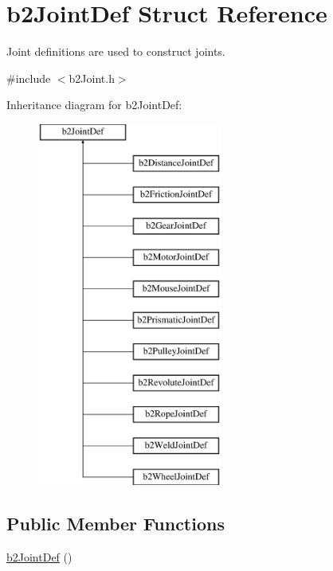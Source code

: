 \hypertarget{structb2_joint_def}{}\section{b2\+Joint\+Def Struct Reference}
\label{structb2_joint_def}


Joint definitions are used to construct joints.  




{\ttfamily \#include $<$b2\+Joint.\+h$>$}

Inheritance diagram for b2\+Joint\+Def\+:\begin{figure}[H]
\begin{center}
\leavevmode
\includegraphics[height=12.000000cm]{structb2_joint_def}
\end{center}
\end{figure}
\subsection*{Public Member Functions}
\begin{DoxyCompactItemize}
\item 
\mbox{\hyperlink{structb2_joint_def_a1fdb44829d4fd13c72edb1daacb72f89}{b2\+Joint\+Def}} ()
\end{DoxyCompactItemize}
